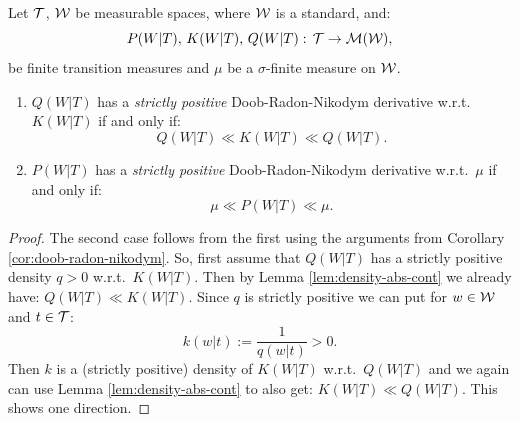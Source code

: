 \begin{Cor}
    \label{cor:abs-cont-str-pos-den}
    Let $\mathcal{T}$, $\mathcal{W}$ be measurable spaces, where $\mathcal{W}$ is a standard, and:
    \[ P(W|T),\, K(W|T), \,Q(W|T):\, \mathcal{T} \to \mathcal{M}(\mathcal{W}),  \]
    be finite transition measures and $\mu$ be a $\sigma$-finite measure on $\mathcal{W}$. 
    \begin{enumerate}
        \item $Q(W|T)$ has a \emph{strictly positive} Doob-Radon-Nikodym derivative w.r.t.\ $K(W|T)$ if and only if:
            \[ Q(W|T) \ll K(W|T) \ll Q(W|T).   \]
        \item $P(W|T)$ has a \emph{strictly positive} Doob-Radon-Nikodym derivative w.r.t.\ $\mu$ if and only if:
            \[ \mu \ll P(W|T) \ll \mu.   \]
    \end{enumerate}
\begin{proof}
    The second case follows from the first using the arguments from Corollary \ref{cor:doob-radon-nikodym}. 
    So, first assume that $Q(W|T)$ has a strictly positive density $q >0$ w.r.t.\ $K(W|T)$. Then by Lemma \ref{lem:density-abs-cont} we already have: 
    $Q(W|T) \ll K(W|T)$. Since $q$ is strictly positive we can put for $w \in \mathcal{W}$ and $t \in \mathcal{T}$:
    \[
        k(w|t) := \frac{1}{q(w|t)} >0.
    \]
    Then $k$ is a (strictly positive) density of $K(W|T)$ w.r.t.\ $Q(W|T)$ and we again can use Lemma \ref{lem:density-abs-cont} to also get: $K(W|T) \ll Q(W|T)$.
    This shows one direction.


\end{proof}
\end{Cor}

